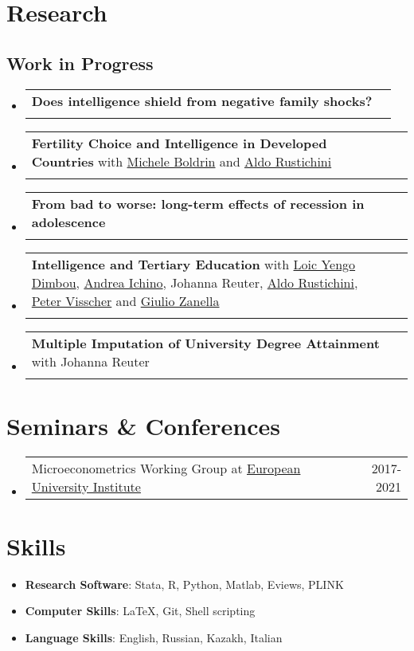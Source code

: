 \documentclass[a4, 11pt]{article}
\makeatletter
\newcommand{\resumePublicationHeading}[3]{
        \item
        \begin{tabularx}{0.97\textwidth}{X@{\extracolsep{2em}}r}
          #1 & #2 \\
          \multicolumn{2}{l}{\textit{\small#3}}
        \end{tabularx}
    }
\newcommand{\resumeOtherHeading}[2]{
      \item
      \begin{tabularx}{0.97\textwidth}{X@{\extracolsep{2em}}r}
        #1 & #2
      \end{tabularx}
    }
\newcommand{\resumeSubHeadingListStart}{\begin{itemize}[leftmargin=0.15in, label={}]}
\newcommand{\resumeSubHeadingListEnd}{\end{itemize}}
\makeatother
\begin{document}
    \section*{Research}\subsection{Work in Progress}
        \resumeSubHeadingListStart    \resumePublicationHeading
      { \textbf{Does intelligence shield from negative family shocks?} }
      {}
      {}    \resumePublicationHeading
      { \textbf{Fertility Choice and Intelligence in Developed Countries} with \href{https://economics.wustl.edu/people/michele-boldrin}{Michele Boldrin} and 
      \href{https://sites.google.com/site/aldorustichini/}{Aldo Rustichini} }
      {}
      {}    \resumePublicationHeading
      { \textbf{From bad to worse: long-term effects of recession in adolescence} }
      {}
      {}    \resumePublicationHeading
      { \textbf{Intelligence and Tertiary Education} with \href{https://researchers.uq.edu.au/researcher/14187}{Loic Yengo Dimbou},
      \href{http://www.andreaichino.it}{Andrea Ichino},
      Johanna Reuter,
      \href{https://sites.google.com/site/aldorustichini/}{Aldo Rustichini},
      \href{https://qbi.uq.edu.au/profile/721/peter-visscher}{Peter Visscher} and 
      \href{https://sites.google.com/site/giuliozanella/}{Giulio Zanella} }
      {}
      {}    \resumePublicationHeading
      { \textbf{Multiple Imputation of University Degree Attainment} with Johanna Reuter }
      {}
      {}\resumeSubHeadingListEnd


    \section*{Seminars \& Conferences}
  \resumeSubHeadingListStart
        \resumeOtherHeading
          {{Microeconometrics Working Group} at \href{https://www.eui.eu}{European University Institute} }
          { 2017-2021 }
    \resumeSubHeadingListEnd


    \section{Skills}\begin{itemize}[leftmargin=0.15in, label = {}]
      \item \small{ \textbf{Research Software}: Stata, R, Python, Matlab, Eviews, PLINK}
      \item \small{ \textbf{Computer Skills}: LaTeX, Git, Shell scripting}
      \item \small{ \textbf{Language Skills}: English, Russian, Kazakh, Italian}
  \end{itemize}
\end{document}
